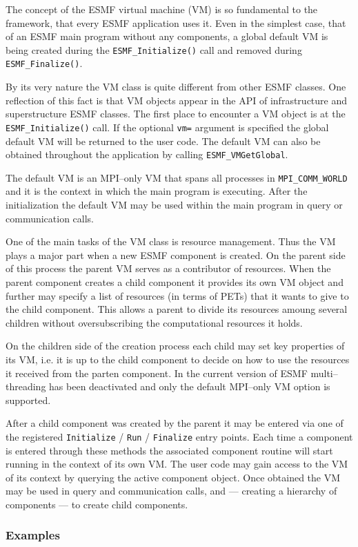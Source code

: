 
The concept of the ESMF virtual machine (VM) is so fundamental to the framework, that every ESMF application uses it. Even in the simplest case, that of an ESMF main program without any components, a global default VM is being created during the {\tt ESMF\_Initialize()} call and removed during {\tt ESMF\_Finalize()}.

By its very nature the VM class is quite different from other ESMF classes. One reflection of this fact is that VM objects appear in the API of infrastructure and superstructure ESMF classes. The first place to encounter a VM object is at the {\tt ESMF\_Initialize()} call. If the optional {\tt vm=} argument is specified the global default VM will be returned to the user code. The default VM can also be obtained throughout the application by calling {\tt ESMF\_VMGetGlobal}.

The default VM is an MPI--only VM that spans all processes in {\tt MPI\_COMM\_WORLD} and it is the context in which the main program is executing. After the initialization the default VM may be used within the main program in query or communication calls. 

One of the main tasks of the VM class is resource management. Thus the VM plays a major part when a new ESMF component is created. On the parent side of this process the parent VM serves as a contributor of resources. When the parent component creates a child component it provides its own VM object and further may specify a list of resources (in terms of PETs) that it wants to give to the child component. This allows a parent to divide its resources amoung several children without oversubscribing the computational resources it holds.

On the children side of the creation process each child may set key properties of its VM, i.e. it is up to the child component to decide on how to use the resources it received from the parten component. In the current version of ESMF multi--threading has been deactivated and only the default MPI--only VM option is supported.


After a child component was created by the parent it may be entered via one of the registered {\tt Initialize} / {\tt Run} / {\tt Finalize} entry points. Each time a component is entered through these methods the associated component routine will start running in the context of its own VM. The user code may gain access to the VM of its context by querying the active component object. Once obtained the VM may be used in query and communication calls, and --- creating a hierarchy of components --- to create child components.
 

\subsubsection{Examples}
